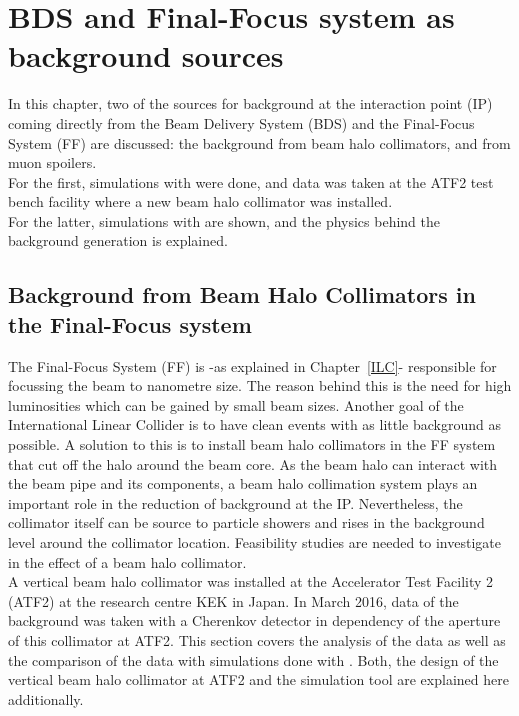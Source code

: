 \chapter{BDS and Final-Focus system as background sources}

\begin{chapterabstract}
 In this chapter, two of the sources for background at the interaction point (IP) coming directly from the Beam Delivery System (BDS) and the Final-Focus System (FF) are discussed: the background from beam halo collimators, and from muon spoilers.\\For the first, simulations with \bdsim were done, and data was taken at the ATF2 test bench facility where a new beam halo collimator was installed.\\For the latter, simulations with \mucarlo are shown, and the physics behind the background generation is explained.
\end{chapterabstract}


\section{Background from Beam Halo Collimators in the Final-Focus system}

The Final-Focus System (FF) is -as explained in Chapter~\ref{ILC}- responsible for focussing the beam to nanometre size. The reason behind this is the need for high luminosities which can be gained by small beam sizes. Another goal of the International Linear Collider is to have clean events with as little background as possible. A solution to this is to install beam halo collimators in the FF system that cut off the halo around the beam core. As the beam halo can interact with the beam pipe and its components, a beam halo collimation system plays an important role in the reduction of background at the IP. Nevertheless, the collimator itself can be source to particle showers and rises in the background level around the collimator location. Feasibility studies are needed to investigate in the effect of a beam halo collimator.\\
A vertical beam halo collimator was installed at the Accelerator Test Facility 2 (ATF2) at the research centre KEK in Japan. In March 2016, data of the background was taken with a Cherenkov detector in dependency of the aperture of this collimator at ATF2. This section covers the analysis of the data as well as the comparison of the data with simulations done with \bdsim. Both, the design of the vertical beam halo collimator at ATF2 and the \geant simulation tool \bdsim are explained here additionally.

